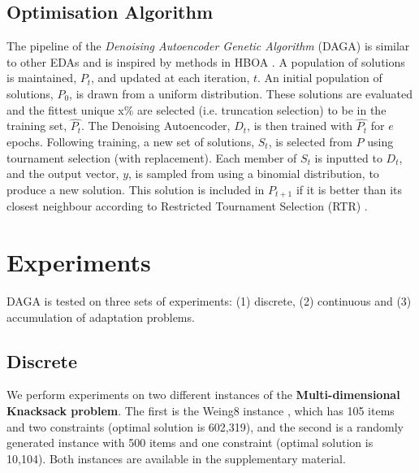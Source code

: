\documentclass[runningheads,a4paper]{llncs}
\begin{document}
\subsection{Optimisation Algorithm}

The pipeline of the \emph{Denoising Autoencoder Genetic Algorithm} (DAGA) is similar to other EDAs and is inspired by methods in HBOA \cite{hboa}. A population of solutions is maintained, \(P_t\), and updated at each iteration, \(t\). An initial population of solutions, \(P_0\), is drawn from a uniform distribution. These solutions are evaluated and the fittest unique x\% are selected (i.e. truncation selection) to be in the training set, \(\hat{P_t}\). The Denoising Autoencoder, \(D_t\), is then trained with \(\hat{P_t}\) for \(e\) epochs. Following training, a new set of solutions, \(S_t\), is selected from \(P\) using tournament selection (with replacement). Each member of \(S_t\) is inputted to \(D_t\), and the output vector, \(y\), is sampled from using a binomial distribution, to produce a new solution. This solution is included in \(P_{t+1}\) if it is better than its closest neighbour according to Restricted Tournament Selection (RTR) \cite{hboa}.

\section{Experiments}
\vspace{-10px}
\label{sec:experiments}
DAGA is tested on three sets of experiments: (1) discrete, (2) continuous and (3) accumulation of adaptation problems. 

\subsection{Discrete}
We perform experiments on two different instances of the \textbf{Multi-dimensional Knacksack problem}. The first is the Weing8 instance \cite{weingartner1967methods}, which has 105 items and two constraints (optimal solution is 602,319), and the second is a randomly generated instance with 500 items and one constraint (optimal solution is 10,104). Both instances are available in the supplementary material.
\end{document}

